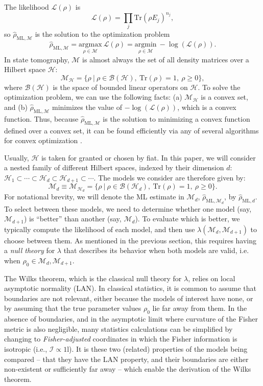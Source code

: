 \documentclass[aps,pra, twocolumn]{revtex4-1}
\newcommand{\M}{\mathcal{M}}
\newcommand{\cH}{\mathcal{H}}
\newcommand{\cL}{\mathcal{L}}
\newcommand{\Id}{\mathbb{I}}
\def\Id{1\!\mathrm{l}}
\newcommand{\rhohat}{\hat{\rho}}
\newcommand{\rhoML}[1]{\rhohat_{\scriptscriptstyle{\mathrm{ML},#1}}}
\begin{document}
The likelihood $\mathcal{L}(\rho)$ is
\begin{equation}
\mathcal{L}(\rho) = \prod_{j}\mathrm{Tr}(\rho E_{j})^{n_{j}},
\end{equation}
so $\rhoML{\M}$ is the solution to the optimization problem
\begin{equation}
\label{eq:mle}
\rhoML{\M} = \underset{\rho \in \M}{\text{argmax}}~\mathcal{L}(\rho) = \underset{\rho \in \M}{\text{argmin}}~-\log(\mathcal{L}(\rho)).
\end{equation}
In state tomography, $\M$ is almost always the set of all density matrices over a Hilbert space $\cH$:
\begin{equation}
\mathcal{M}_{\cH} = \{\rho~|~\rho \in \mathcal{B}(\mathcal{H}),~\mathrm{Tr}(\rho) =1,~\rho \geq 0\},
\end{equation}
where $\mathcal{B}(\cH)$ is the space of bounded linear operators on $\cH$.  To solve the optimization problem, we can use the following facts: (a) $\M_{\cH}$ is a convex set, and (b) $\rhoML{\M}$ minimizes the value of $-\log(\cL(\rho))$, which is a convex function. Thus, because $\rhoML{\M}$ is the solution to minimizing a convex function defined over a convex set, it can be found efficiently via any of several algorithms for convex optimization \cite{Boyd}.

Usually, $\cH$ is taken for granted or chosen by fiat.  In this paper, we will consider a nested family of different Hilbert spaces, indexed by their dimension $d$: $\cH_{1}  \subset \cdots \subset \cH_{d} \subset \cH_{d+1} \subset \cdots$.  The models we consider are therefore given by:
\begin{equation}
\label{eq:modelsd}
\M_{d} \equiv \mathcal{M}_{\cH_{d}} = \{\rho~|~\rho \in \mathcal{B}(\mathcal{H}_{d}),~\mathrm{Tr}(\rho) =1,~\rho \geq 0\}.
\end{equation}
For notational brevity, we will denote the ML estimate in $\M_{d}$, $\rhoML{\M_{d}}$, by $\rhoML{d}$. To select between these models, we need to determine whether one model (say, $\M_{d + 1}$) is ``better'' than another (say, $\M_{d}$).  To evaluate which is better, we typically compute the likelihood of each model, and then use $\lambda(\M_{d}, \M_{d+1})$ to choose between them. As mentioned in the previous section, this requires having a \emph{null theory} for $\lambda$ that describes its behavior when both models are valid, i.e. when $\rho_{0} \in \M_{d},\M_{d + 1}$.

The Wilks theorem, which is the classical null theory for $\lambda$, relies on local asymptotic normality (LAN). In classical statistics, it is common to assume that boundaries are not relevant, either because the models of interest have none, or by assuming that the true parameter values $\rho_{0}$ lie far away from them.  In the absence of boundaries, and in the asymptotic limit where curvature of the Fisher metric is also negligible, many statistics calculations can be simplified by changing to \emph{Fisher-adjusted} coordinates in which the Fisher information is isotropic (i.e., $\mathcal{I}\propto\Id$). It is these two (related) properties of the models being compared -- that they have the LAN property, and their boundaries are either non-existent or sufficiently far away -- which enable the derivation of the Wilks theorem.
\end{document}
